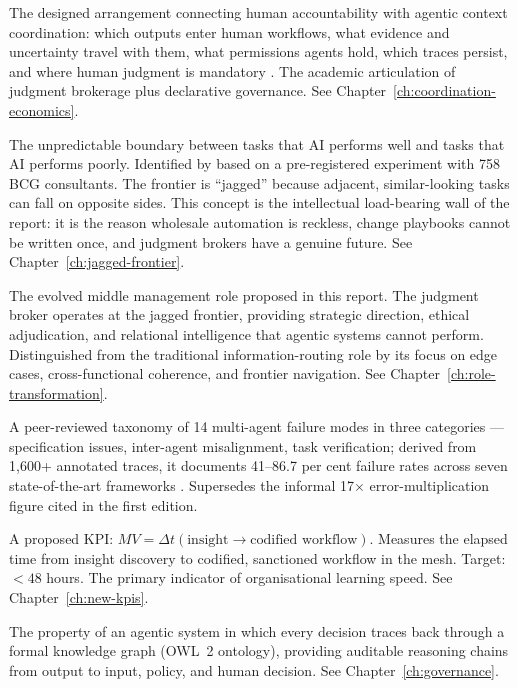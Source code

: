 \begin{description}[style=nextline, leftmargin=2em, font=\bfseries\color{navyblue}]
\item[Interface Organisation]
The designed arrangement connecting human accountability with agentic context coordination: which outputs enter human workflows, what evidence and uncertainty travel with them, what permissions agents hold, which traces persist, and where human judgment is mandatory \parencite{Liu2026}. The academic articulation of judgment brokerage plus declarative governance. See Chapter~\ref{ch:coordination-economics}.

\item[Jagged Frontier]
The unpredictable boundary between tasks that AI performs well and tasks that AI performs poorly. Identified by \textcite{DellAcqua2026} based on a pre-registered experiment with 758 BCG consultants. The frontier is ``jagged'' because adjacent, similar-looking tasks can fall on opposite sides. This concept is the intellectual load-bearing wall of the report: it is the reason wholesale automation is reckless, change playbooks cannot be written once, and judgment brokers have a genuine future. See Chapter~\ref{ch:jagged-frontier}.

\item[Judgment Broker]
The evolved middle management role proposed in this report. The judgment broker operates at the jagged frontier, providing strategic direction, ethical adjudication, and relational intelligence that agentic systems cannot perform. Distinguished from the traditional information-routing role by its focus on edge cases, cross-functional coherence, and frontier navigation. See Chapter~\ref{ch:role-transformation}.

\item[MAST (Multi-Agent System Failure Taxonomy)]
A peer-reviewed taxonomy of 14 multi-agent failure modes in three categories --- specification issues, inter-agent misalignment, task verification; derived from 1,600+ annotated traces, it documents 41--86.7 per cent failure rates across seven state-of-the-art frameworks \parencite{Cemri2025}. Supersedes the informal 17$\times$ error-multiplication figure cited in the first edition.

\item[Mesh Velocity (MV)]
A proposed KPI: $MV = \Delta t(\text{insight} \rightarrow \text{codified workflow})$. Measures the elapsed time from insight discovery to codified, sanctioned workflow in the mesh. Target: $<48$ hours. The primary indicator of organisational learning speed. See Chapter~\ref{ch:new-kpis}.

\item[Ontological Provenance]
The property of an agentic system in which every decision traces back through a formal knowledge graph (OWL~2 ontology), providing auditable reasoning chains from output to input, policy, and human decision. See Chapter~\ref{ch:governance}.


\end{description}
